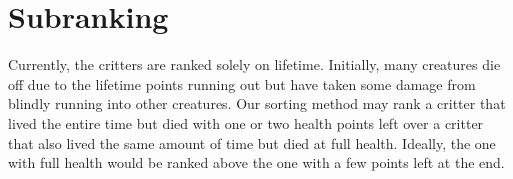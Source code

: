\section{Subranking}
Currently, the critters are ranked solely on lifetime. Initially, many creatures die off due to the lifetime points running out but have taken some damage from blindly running into other creatures. Our sorting method may rank a critter that lived the entire time but died with one or two health points left over a critter that also lived the same amount of time but died at full health. Ideally, the one with full health would be ranked above the one with a few points left at the end. \\